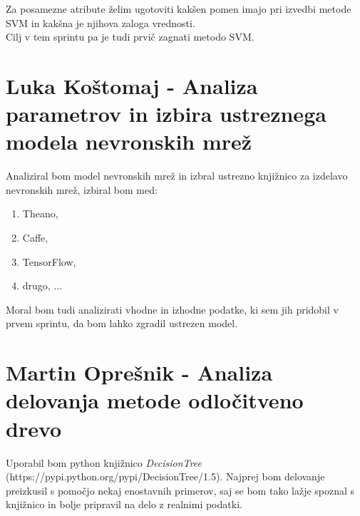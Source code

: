\documentclass[a4paper,11pt]{article}
\begin{document}
Za posamezne atribute želim ugotoviti kakšen pomen imajo pri izvedbi metode SVM in kakšna je njihova zaloga vrednosti.\\
Cilj v tem sprintu pa je tudi prvič zagnati metodo SVM. 

\section{Luka Koštomaj - Analiza parametrov in izbira ustreznega modela nevronskih mrež}

Analiziral bom model nevronskih mrež in izbral ustrezno knjižnico za izdelavo nevronskih mrež, izbiral bom med:
\begin{enumerate}
	\item {Theano,}
	\item {Caffe,}
	\item {TensorFlow,}
	\item {drugo, ...}

\end{enumerate}

Moral bom tudi analizirati vhodne in izhodne podatke, ki sem jih pridobil v prvem sprintu, da bom lahko zgradil ustrezen model.
 
\section{Martin Oprešnik - Analiza delovanja metode odločitveno drevo }

Uporabil bom python knjižnico \textit{DecisionTree} (https://pypi.python.org/pypi/DecisionTree/1.5).
Najprej bom delovanje preizkusil s pomočjo nekaj enostavnih primerov, saj se bom tako lažje
spoznal s knjižnico in bolje pripravil na delo z realnimi podatki.
\end{document}
